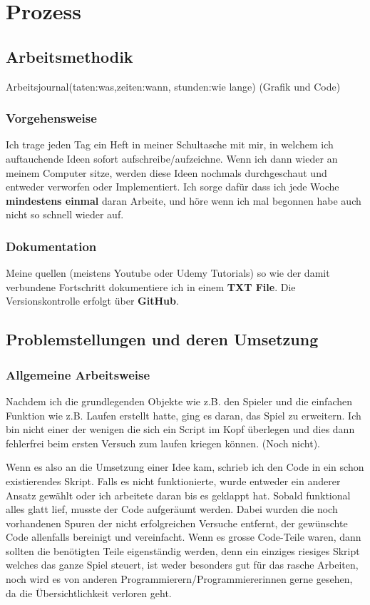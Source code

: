 \chapter{Prozess}

\section{Arbeitsmethodik}

Arbeitsjournal(taten:was,zeiten:wann, stunden:wie lange)
(Grafik und Code)

\subsection{Vorgehensweise} 
Ich trage jeden Tag ein Heft in meiner Schultasche mit mir, in welchem ich auftauchende Ideen sofort aufschreibe/aufzeichne.
Wenn ich dann wieder an meinem Computer sitze, werden diese Ideen nochmals durchgeschaut und entweder verworfen oder Implementiert.
Ich sorge dafür dass ich jede Woche \textbf{mindestens einmal} daran Arbeite, und höre wenn ich mal begonnen habe auch nicht so schnell wieder auf.

\subsection{Dokumentation}
Meine quellen (meistens Youtube oder Udemy Tutorials) so wie der damit verbundene Fortschritt dokumentiere ich in einem \textbf{TXT File}.
Die Versionskontrolle erfolgt über \textbf{GitHub}.

\section{Problemstellungen und deren Umsetzung}

\subsection{Allgemeine Arbeitsweise}
Nachdem ich die grundlegenden Objekte wie z.B. den Spieler und die einfachen Funktion wie z.B. Laufen erstellt hatte, ging es daran, das Spiel zu erweitern. Ich bin nicht einer der wenigen die sich ein Script im Kopf überlegen und dies dann fehlerfrei beim ersten Versuch zum laufen kriegen können. (Noch nicht).

Wenn es also an die Umsetzung einer Idee kam, schrieb ich den Code in ein schon existierendes Skript.
Falls es nicht funktionierte, wurde entweder ein anderer Ansatz gewählt oder ich arbeitete daran bis es geklappt hat.
Sobald funktional alles glatt lief, musste der Code aufgeräumt werden. Dabei wurden die noch vorhandenen Spuren der nicht erfolgreichen Versuche entfernt, der gewünschte Code allenfalls bereinigt und vereinfacht. Wenn es grosse Code-Teile waren, dann sollten die benötigten Teile eigenständig werden, denn ein einziges riesiges Skript welches das ganze Spiel steuert, ist weder besonders gut für das rasche Arbeiten, noch wird es von anderen Programmierern/Programmiererinnen gerne gesehen, da die Übersichtlichkeit verloren geht.

